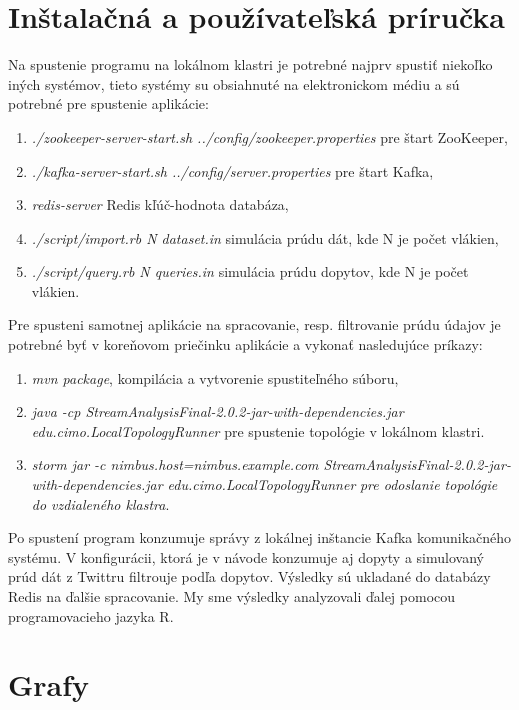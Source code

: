 \emptysinglepage
\section{Inštalačná a používateľská príručka}
Na spustenie programu na lokálnom klastri je potrebné najprv spustiť niekoľko iných systémov, tieto systémy su obsiahnuté na elektronickom médiu a sú potrebné pre spustenie aplikácie:
\begin{enumerate}
	\item \textit{./zookeeper-server-start.sh ../config/zookeeper.properties} pre štart ZooKeeper,
	\item \textit{./kafka-server-start.sh ../config/server.properties} pre štart Kafka,
	\item \textit{redis-server} Redis kľúč-hodnota databáza,
	\item \textit{./script/import.rb N dataset.in} simulácia prúdu dát, kde N je počet vlákien,
	\item \textit{./script/query.rb N queries.in} simulácia prúdu dopytov, kde N je počet vlákien.
\end{enumerate}
Pre spusteni samotnej aplikácie na spracovanie, resp. filtrovanie prúdu údajov je potrebné byť v koreňovom priečinku aplikácie a vykonať nasledujúce príkazy:
\begin{enumerate}
	\item \textit{mvn package}, kompilácia a vytvorenie spustiteľného súboru,
	\item \textit{java -cp StreamAnalysisFinal-2.0.2-jar-with-dependencies.jar edu.cimo.LocalTopologyRunner} pre spustenie topológie v lokálnom klastri.
	\item \textit{storm jar -c nimbus.host=nimbus.example.com StreamAnalysisFinal-2.0.2-jar-with-dependencies.jar edu.cimo.LocalTopologyRunner} \textit{pre odoslanie topológie do vzdialeného klastra}.
\end{enumerate}

Po spustení program konzumuje správy z lokálnej inštancie Kafka komunikačného systému. V konfigurácii, ktorá je v návode konzumuje aj dopyty a simulovaný prúd dát z Twittru filtrouje podľa dopytov. Výsledky sú ukladané do databázy Redis na ďalšie spracovanie. My sme výsledky analyzovali ďalej pomocou programovacieho jazyka R. 
\newpage
\section{Grafy}
